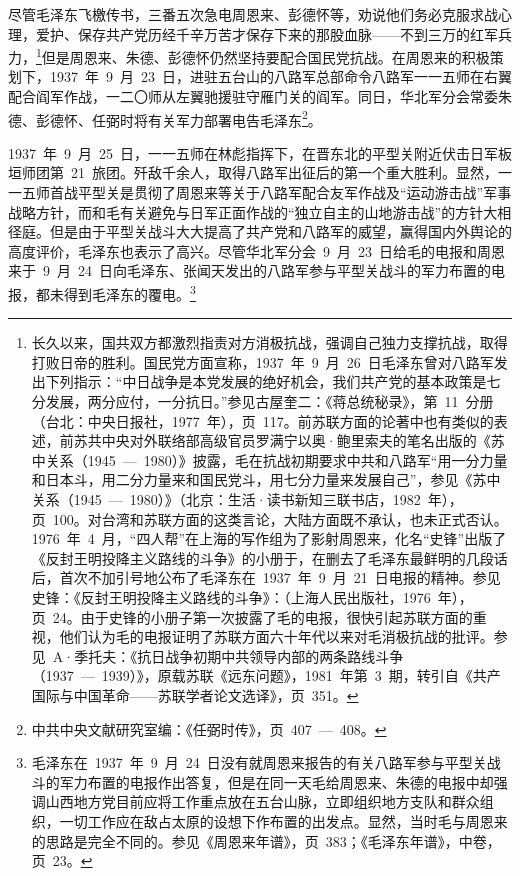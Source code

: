 尽管毛泽东飞檄传书，三番五次急电周恩来、彭德怀等，劝说他们务必克服求战心理，爱护、保存共产党历经千辛万苦才保存下来的那股血脉——不到三万的红军兵力，\footnote{长久以来，国共双方都激烈指责对方消极抗战，强调自己独力支撑抗战，取得打败日帝的胜利。国民党方面宣称，1937~年~9~月~26~日毛泽东曾对八路军发出下列指示：“中日战争是本党发展的绝好机会，我们共产党的基本政策是七分发展，两分应付，一分抗日。”参见古屋奎二：《蒋总统秘录》，第~11~分册（台北：中央日报社，1977~年），页~117。前苏联方面的论著中也有类似的表述，前苏共中央对外联络部高级官员罗满宁以奥·鲍里索夫的笔名出版的《苏中关系（1945~—~1980）》披露，毛在抗战初期要求中共和八路军“用一分力量和日本斗，用二分力量来和国民党斗，用七分力量来发展自己”，参见《苏中关系（1945~—~1980）》（北京：生活·读书新知三联书店，1982~年），页~100。对台湾和苏联方面的这类言论，大陆方面既不承认，也未正式否认。1976~年~4~月，“四人帮”在上海的写作组为了影射周恩来，化名“史锋”出版了《反封王明投降主义路线的斗争》的小册于，在删去了毛泽东最鲜明的几段话后，首次不加引号地公布了毛泽东在~1937~年~9~月~21~日电报的精神。参见史锋：《反封王明投降主义路线的斗争》：（上海人民出版社，1976~年），页~24。由于史锋的小册子第一次披露了毛的电报，很快引起苏联方面的重视，他们认为毛的电报证明了苏联方面六十年代以来对毛消极抗战的批评。参见~A·季托夫：《抗日战争初期中共领导内部的两条路线斗争（1937~—~1939）》，原载苏联《远东问题》，1981~年第~3~期，转引自《共产国际与中国革命——苏联学者论文选译》，页~351。}但是周恩来、朱德、彭德怀仍然坚持要配合国民党抗战。在周恩来的积极策划下，1937~年~9~月~23~日，进驻五台山的八路军总部命令八路军一一五师在右翼配合阎军作战，一二〇师从左翼驰援驻守雁门关的阎军。同日，华北军分会常委朱德、彭德怀、任弼时将有关军力部署电告毛泽东\footnote{中共中央文献研究室编：《任弼时传》，页~407~—~408。}。

1937~年~9~月~25~日，一一五师在林彪指挥下，在晋东北的平型关附近伏击日军板垣师团第~21~旅团。歼敌千余人，取得八路军出征后的第一个重大胜利。显然，一一五师首战平型关是贯彻了周恩来等关于八路军配合友军作战及“运动游击战”军事战略方针，而和毛有关避免与日军正面作战的“独立自主的山地游击战”的方针大相径庭。但是由于平型关战斗大大提高了共产党和八路军的威望，赢得国内外舆论的高度评价，毛泽东也表示了高兴。尽管华北军分会~9~月~23~日给毛的电报和周恩来于~9~月~24~日向毛泽东、张闻天发出的八路军参与平型关战斗的军力布置的电报，都未得到毛泽东的覆电。\footnote{毛泽东在~1937~年~9~月~24~日没有就周恩来报告的有关八路军参与平型关战斗的军力布置的电报作出答复，但是在同一天毛给周恩来、朱德的电报中却强调山西地方党目前应将工作重点放在五台山脉，立即组织地方支队和群众组织，一切工作应在敌占太原的设想下作布置的出发点。显然，当时毛与周恩来的思路是完全不同的。参见《周恩来年谱》，页~383；《毛泽东年谱》，中卷，页~23。}


